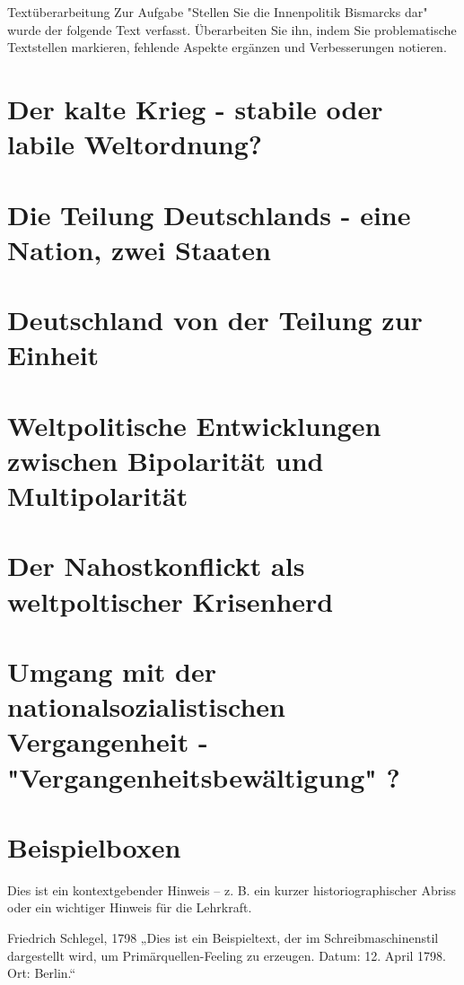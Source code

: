 \documentclass[11pt,a4paper,oneside]{article}
\begin{document}
	\begin{histaufgabe}{Textüberarbeitung}
		Zur Aufgabe "Stellen Sie die Innenpolitik Bismarcks dar" wurde der folgende Text verfasst. Überarbeiten Sie ihn, indem Sie problematische Textstellen markieren, fehlende Aspekte ergänzen und Verbesserungen notieren.
	\end{histaufgabe}
	
	
	\newpage
	
	
	\section{Der kalte Krieg - stabile oder labile Weltordnung?}
	\section{Die Teilung Deutschlands - eine Nation, zwei Staaten}
	\section{Deutschland von der Teilung zur Einheit}
	\section{Weltpolitische Entwicklungen zwischen Bipolarität und Multipolarität}
	\section{Der Nahostkonflickt als weltpoltischer Krisenherd}
	\section{Umgang mit der nationalsozialistischen Vergangenheit - "Vergangenheitsbewältigung" ?}
	
	\newpage
	
	\section{Beispielboxen}
	
	\begin{histnote}
		Dies ist ein kontextgebender Hinweis – z. B. ein kurzer historiographischer Abriss oder ein wichtiger Hinweis für die Lehrkraft.
	\end{histnote}

	
	\begin{primarysource}{Friedrich Schlegel, 1798}
		„Dies ist ein Beispieltext, der im Schreibmaschinenstil dargestellt wird, um Primärquellen-Feeling zu erzeugen.
		Datum: 12. April 1798. Ort: Berlin.“
	\end{primarysource}
	
\end{document}
